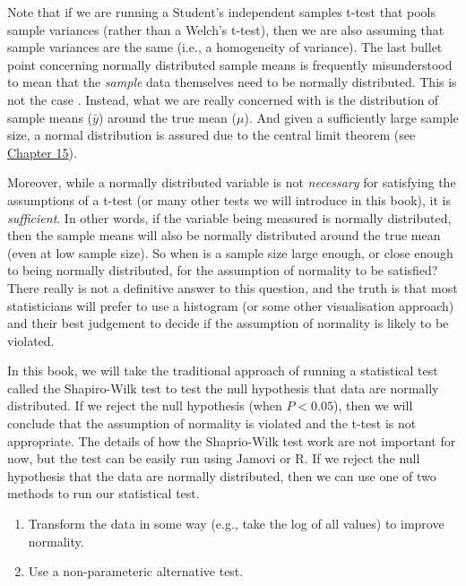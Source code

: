 \documentclass[
]{scrbook}
\providecommand{\tightlist}{%
  \setlength{\itemsep}{0pt}\setlength{\parskip}{0pt}}
\begin{document}
Note that if we are running a Student's independent samples t-test that pools sample variances (rather than a Welch's t-test), then we are also assuming that sample variances are the same (i.e., a homogeneity of variance).
The last bullet point concerning normally distributed sample means is frequently misunderstood to mean that the \emph{sample} data themselves need to be normally distributed.
This is not the case \citep{Johnson1995, Lumley2002}.
Instead, what we are really concerned with is the distribution of sample means (\(\bar{y}\)) around the true mean (\(\mu\)).
And given a sufficiently large sample size, a normal distribution is assured due to the central limit theorem (see \protect\hyperlink{Chapter_15}{Chapter 15}).

Moreover, while a normally distributed variable is not \emph{necessary} for satisfying the assumptions of a t-test (or many other tests we will introduce in this book), it is \emph{sufficient}.
In other words, if the variable being measured is normally distributed, then the sample means will also be normally distributed around the true mean (even at low sample size).
So when is a sample size large enough, or close enough to being normally distributed, for the assumption of normality to be satisfied?
There really is not a definitive answer to this question, and the truth is that most statisticians will prefer to use a histogram (or some other visualisation approach) and their best judgement to decide if the assumption of normality is likely to be violated.

In this book, we will take the traditional approach of running a statistical test called the Shapiro-Wilk test to test the null hypothesis that data are normally distributed.
If we reject the null hypothesis (when \(P < 0.05\)), then we will conclude that the assumption of normality is violated and the t-test is not appropriate.
The details of how the Shaprio-Wilk test work are not important for now, but the test can be easily run using Jamovi or R.
If we reject the null hypothesis that the data are normally distributed, then we can use one of two methods to run our statistical test.

\begin{enumerate}
\def\labelenumi{\arabic{enumi}.}
\tightlist
\item
  Transform the data in some way (e.g., take the log of all values) to improve normality.
\item
  Use a non-parameteric alternative test.
\end{enumerate}
\end{document}
